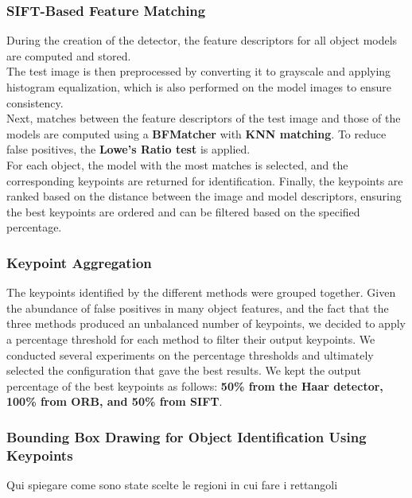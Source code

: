 \documentclass[10.5pt,a4paper]{article}
\begin{document}
\subsubsection*{SIFT-Based Feature Matching}
    During the creation of the detector, the feature descriptors for all object models are computed and stored.\\
    The test image is then preprocessed by converting it to grayscale and applying histogram equalization, which is also performed on the model images to ensure consistency.\\
    Next, matches between the feature descriptors of the test image and those of the models are computed using a \textbf{BFMatcher} with \textbf{KNN matching}. To reduce false positives, the \textbf{Lowe’s Ratio test} is applied.\\
    For each object, the model with the most matches is selected, and the corresponding keypoints are returned for identification. Finally, the keypoints are ranked based on the distance between the image and model descriptors, ensuring the best keypoints are ordered and can be filtered based on the specified percentage.

\subsubsection*{Keypoint Aggregation}
The keypoints identified by the different methods were grouped together. Given the abundance of false positives in many object features, and the fact that the three methods produced an unbalanced number of keypoints, we decided to apply a percentage threshold for each method to filter their output keypoints. We conducted several experiments on the percentage thresholds and ultimately selected the configuration that gave the best results. We kept the output percentage of the best keypoints as follows: \textbf{50\% from the Haar detector, 100\% from ORB, and 50\% from SIFT}.

\subsubsection*{Bounding Box Drawing for Object Identification Using Keypoints}
Qui spiegare come sono state scelte le regioni in cui fare i rettangoli
\end{document}
